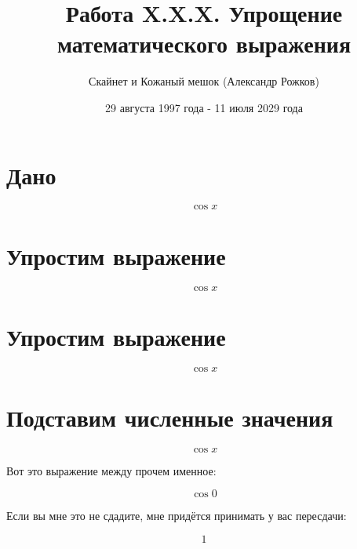 \documentclass[12pt]{article}
\title{Работа X.X.X. Упрощение математического выражения}
\author{Скайнет и Кожаный мешок (Александр Рожков)}
\date{29 августа 1997 года - 11 июля 2029 года}
\begin{document}
\maketitle
\newpage

\section{Дано}

$$ \cos{x  }  $$

\section{Упростим выражение}

$$ \cos{x  }  $$

\section{Упростим выражение}

$$ \cos{x  }  $$

\section{Подставим численные значения}

$$ \cos{x  }  $$

Вот это выражение между прочем именное:

$$ \cos{0  }  $$

Если вы мне это не сдадите, мне придётся принимать у вас пересдачи:

$$ 1  $$
\end{document}

